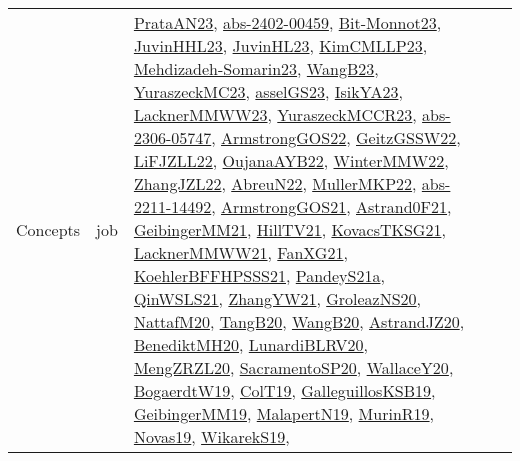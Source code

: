 {\begin{longtable}{llp{6cm}p{6cm}p{6cm}}
Concepts & job & \href{articles/PrataAN23.pdf}{PrataAN23}\cite{PrataAN23}, \href{articles/abs-2402-00459.pdf}{abs-2402-00459}\cite{abs-2402-00459}, \href{papers/Bit-Monnot23.pdf}{Bit-Monnot23}\cite{Bit-Monnot23}, \href{papers/JuvinHHL23.pdf}{JuvinHHL23}\cite{JuvinHHL23}, \href{papers/JuvinHL23.pdf}{JuvinHL23}\cite{JuvinHL23}, \href{papers/KimCMLLP23.pdf}{KimCMLLP23}\cite{KimCMLLP23}, \href{papers/Mehdizadeh-Somarin23.pdf}{Mehdizadeh-Somarin23}\cite{Mehdizadeh-Somarin23}, \href{papers/WangB23.pdf}{WangB23}\cite{WangB23}, \href{papers/YuraszeckMC23.pdf}{YuraszeckMC23}\cite{YuraszeckMC23}, \href{papers/asselGS23.pdf}{asselGS23}\cite{asselGS23}, \href{articles/IsikYA23.pdf}{IsikYA23}\cite{IsikYA23}, \href{articles/LacknerMMWW23.pdf}{LacknerMMWW23}\cite{LacknerMMWW23}, \href{articles/YuraszeckMCCR23.pdf}{YuraszeckMCCR23}\cite{YuraszeckMCCR23}, \href{articles/abs-2306-05747.pdf}{abs-2306-05747}\cite{abs-2306-05747}, \href{papers/ArmstrongGOS22.pdf}{ArmstrongGOS22}\cite{ArmstrongGOS22}, \href{papers/GeitzGSSW22.pdf}{GeitzGSSW22}\cite{GeitzGSSW22}, \href{papers/LiFJZLL22.pdf}{LiFJZLL22}\cite{LiFJZLL22}, \href{papers/OujanaAYB22.pdf}{OujanaAYB22}\cite{OujanaAYB22}, \href{papers/WinterMMW22.pdf}{WinterMMW22}\cite{WinterMMW22}, \href{papers/ZhangJZL22.pdf}{ZhangJZL22}\cite{ZhangJZL22}, \href{articles/AbreuN22.pdf}{AbreuN22}\cite{AbreuN22}, \href{articles/MullerMKP22.pdf}{MullerMKP22}\cite{MullerMKP22}, \href{articles/abs-2211-14492.pdf}{abs-2211-14492}\cite{abs-2211-14492}, \href{papers/ArmstrongGOS21.pdf}{ArmstrongGOS21}\cite{ArmstrongGOS21}, \href{papers/Astrand0F21.pdf}{Astrand0F21}\cite{Astrand0F21}, \href{papers/GeibingerMM21.pdf}{GeibingerMM21}\cite{GeibingerMM21}, \href{papers/HillTV21.pdf}{HillTV21}\cite{HillTV21}, \href{papers/KovacsTKSG21.pdf}{KovacsTKSG21}\cite{KovacsTKSG21}, \href{papers/LacknerMMWW21.pdf}{LacknerMMWW21}\cite{LacknerMMWW21}, \href{articles/FanXG21.pdf}{FanXG21}\cite{FanXG21}, \href{articles/KoehlerBFFHPSSS21.pdf}{KoehlerBFFHPSSS21}\cite{KoehlerBFFHPSSS21}, \href{articles/PandeyS21a.pdf}{PandeyS21a}\cite{PandeyS21a}, \href{articles/QinWSLS21.pdf}{QinWSLS21}\cite{QinWSLS21}, \href{articles/ZhangYW21.pdf}{ZhangYW21}\cite{ZhangYW21}, \href{papers/GroleazNS20.pdf}{GroleazNS20}\cite{GroleazNS20}, \href{papers/NattafM20.pdf}{NattafM20}\cite{NattafM20}, \href{papers/TangB20.pdf}{TangB20}\cite{TangB20}, \href{papers/WangB20.pdf}{WangB20}\cite{WangB20}, \href{articles/AstrandJZ20.pdf}{AstrandJZ20}\cite{AstrandJZ20}, \href{articles/BenediktMH20.pdf}{BenediktMH20}\cite{BenediktMH20}, \href{articles/LunardiBLRV20.pdf}{LunardiBLRV20}\cite{LunardiBLRV20}, \href{articles/MengZRZL20.pdf}{MengZRZL20}\cite{MengZRZL20}, \href{articles/SacramentoSP20.pdf}{SacramentoSP20}\cite{SacramentoSP20}, \href{articles/WallaceY20.pdf}{WallaceY20}\cite{WallaceY20}, \href{papers/BogaerdtW19.pdf}{BogaerdtW19}\cite{BogaerdtW19}, \href{papers/ColT19.pdf}{ColT19}\cite{ColT19}, \href{papers/GalleguillosKSB19.pdf}{GalleguillosKSB19}\cite{GalleguillosKSB19}, \href{papers/GeibingerMM19.pdf}{GeibingerMM19}\cite{GeibingerMM19}, \href{papers/MalapertN19.pdf}{MalapertN19}\cite{MalapertN19}, \href{papers/MurinR19.pdf}{MurinR19}\cite{MurinR19}, \href{articles/Novas19.pdf}{Novas19}\cite{Novas19}, \href{articles/WikarekS19.pdf}{WikarekS19}\cite{WikarekS19}, 
\end{longtable}}
